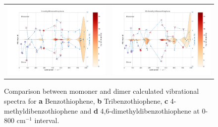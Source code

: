 \begin{figure}[H]
\begin{center}
{\begin{tabular}{c c}
						\includegraphics[scale=0.45]{image/P2-16c} & \includegraphics[scale=0.45]{image/P2-16d}\\
					\end{tabular}}
				\end{center}
				\caption{Comparison between momoner and dimer calculated vibrational spectra for \textbf{a} Benzothiophene, \textbf{b} Tribenzothiophene, \textbf{c} 4-methyldibenzothiophene and \textbf{d} 4,6-dimethyldibenzothiophene at 0- 800 cm$^{-1}$ interval.}  \label{figP2-16ad}
			\end{figure}
	
